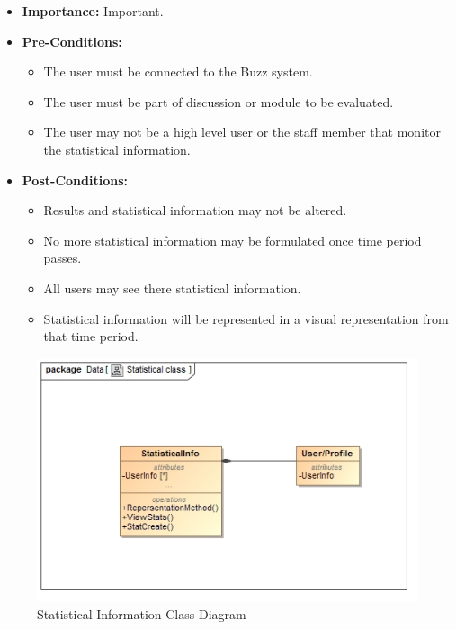 \documentclass[11pt]{article}
\begin{document}
\begin{enumerate}
\begin{itemize}
 
\item\textbf{Importance:} Important.



\item\textbf{Pre-Conditions: }
	\begin{itemize}
		\item The user must be connected to the Buzz system.
		\item The user must be part of discussion or module to be evaluated.
		\item The user may not be a high level user or the staff member that monitor the statistical information.
	\end{itemize}
 

\item\textbf{Post-Conditions: }
	\begin{itemize}
		\item Results and statistical information may not be altered.
		\item No more statistical information may be formulated once time period passes.
		\item All users may see there statistical information.
		\item Statistical information will be represented in a visual representation from that time period.
	\end{itemize}
\end{itemize}
\graphicspath{ {../Diagrams/Matt/Class/} }
	  \begin{figure}[H]	
    	\includegraphics[scale=0.5,center]{StatisticalClass.jpg}
    	\caption{Statistical Information Class Diagram}
	\end{figure}


\end{enumerate}
\end{document}
